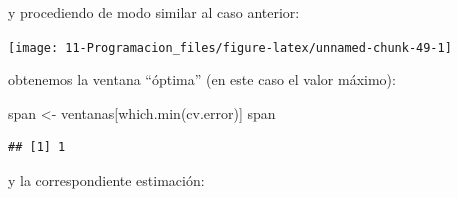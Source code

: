 \documentclass[
]{book}
\newenvironment{Shaded}{\begin{snugshade}}{\end{snugshade}}
\newcommand{\AttributeTok}[1]{\textcolor[rgb]{0.77,0.63,0.00}{#1}}
\newcommand{\CommentTok}[1]{\textcolor[rgb]{0.56,0.35,0.01}{\textit{#1}}}
\newcommand{\ControlFlowTok}[1]{\textcolor[rgb]{0.13,0.29,0.53}{\textbf{#1}}}
\newcommand{\DecValTok}[1]{\textcolor[rgb]{0.00,0.00,0.81}{#1}}
\newcommand{\FloatTok}[1]{\textcolor[rgb]{0.00,0.00,0.81}{#1}}
\newcommand{\FunctionTok}[1]{\textcolor[rgb]{0.00,0.00,0.00}{#1}}
\newcommand{\NormalTok}[1]{#1}
\newcommand{\OtherTok}[1]{\textcolor[rgb]{0.56,0.35,0.01}{#1}}
\newcommand{\SpecialCharTok}[1]{\textcolor[rgb]{0.00,0.00,0.00}{#1}}
\theoremstyle{break}
\begin{document}
y procediendo de modo similar al caso anterior:

\begin{Shaded}
\end{Shaded}

\begin{center}\texttt{[image: 11-Programacion\_files/figure-latex/unnamed-chunk-49-1]} \end{center}

obtenemos la ventana ``óptima'' (en este caso el valor máximo):

\begin{Shaded}
\begin{Highlighting}[]
\NormalTok{span }\OtherTok{\textless{}{-}}\NormalTok{ ventanas[}\FunctionTok{which.min}\NormalTok{(cv.error)]}
\NormalTok{span}
\end{Highlighting}
\end{Shaded}

\begin{verbatim}
## [1] 1
\end{verbatim}

y la correspondiente estimación:
\end{document}

